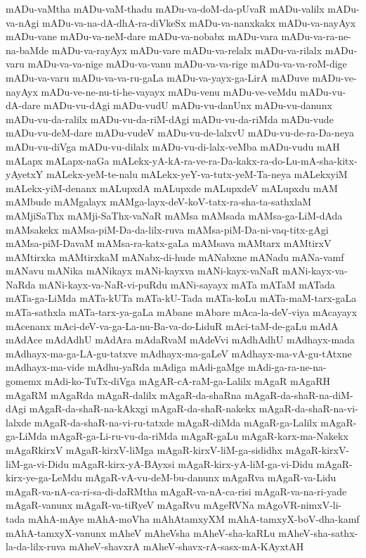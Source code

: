 {mADu-vaMtha
mADu-vaM-thadu
mADu-va-doM-da-pUvaR
mADu-valilx
mADu-va-nAgi
mADu-va-na-dA-dhA-ra-diVkeSx
mADu-va-nanxkakx
mADu-va-nayAyx
mADu-vane
mADu-va-neM-dare
mADu-va-nobabx
mADu-vara
mADu-va-ra-ne-na-baMde
mADu-va-rayAyx
mADu-vare
mADu-va-relalx
mADu-va-rilalx
mADu-varu
mADu-va-va-nige
mADu-va-vanu
mADu-va-va-rige
mADu-va-va-roM-dige
mADu-va-varu
mADu-va-va-ru-gaLa
mADu-va-yayx-ga-LirA
mADuve
mADu-ve-nayAyx
mADu-ve-ne-nu-ti-he-vayayx
mADu-venu
mADu-ve-veMdu
mADu-vu-dA-dare
mADu-vu-dAgi
mADu-vudU
mADu-vu-danUnx
mADu-vu-danunx
mADu-vu-da-ralilx
mADu-vu-da-riM-dAgi
mADu-vu-da-riMda
mADu-vude
mADu-vu-deM-dare
mADu-vudeV
mADu-vu-de-lalxvU
mADu-vu-de-ra-Da-neya
mADu-vu-diVga
mADu-vu-dilalx
mADu-vu-di-lalx-veMba
mADu-vudu
mAH
mALapx
mALapx-naGa
mALekx-yA-kA-ra-ve-ra-Da-kakx-ra-do-Lu-mA-sha-kitx-yAyetxY
mALekx-yeM-te-nalu
mALekx-yeY-va-tutx-yeM-Ta-neya
mALekxyiM
mALekx-yiM-denanx
mALupxdA
mALupxde
mALupxdeV
mALupxdu
mAM
mAMbude
mAMgalayx
mAMga-layx-deV-koV-tatx-ra-sha-ta-sathxlaM
mAMjiSaThx
mAMji-SaThx-vaNaR
mAMsa
mAMsada
mAMsa-ga-LiM-dAda
mAMsakekx
mAMsa-piM-Da-da-lilx-ruva
mAMsa-piM-Da-ni-vaq-titx-gAgi
mAMsa-piM-DavaM
mAMsa-ra-katx-gaLa
mAMsava
mAMtarx
mAMtirxV
mAMtirxka
mAMtirxkaM
mANabx-di-hude
mANabxne
mANadu
mANa-vamf
mANavu
mANika
mANikayx
mANi-kayxva
mANi-kayx-vaNaR
mANi-kayx-va-NaRda
mANi-kayx-va-NaR-vi-puRdu
mANi-sayayx
mATa
mATaM
mATada
mATa-ga-LiMda
mATa-kUTa
mATa-kU-Tada
mATa-koLu
mATa-maM-tarx-gaLa
mATa-sathxla
mATa-tarx-ya-gaLa
mAbane
mAbare
mAca-la-deV-viya
mAcayayx
mAcenanx
mAci-deV-va-ga-La-nu-Ba-va-do-LiduR
mAci-taM-de-gaLu
mAdA
mAdAce
mAdAdhU
mAdAra
mAdaRvaM
mAdeVvi
mAdhAdhU
mAdhayx-mada
mAdhayx-ma-ga-LA-gu-tatxve
mAdhayx-ma-gaLeV
mAdhayx-ma-vA-gu-tAtxne
mAdhayx-ma-vide
mAdhu-yaRda
mAdiga
mAdi-gaMge
mAdi-ga-ra-ne-na-gomemx
mAdi-ko-TuTx-diVga
mAgAR-cA-raM-ga-Lalilx
mAgaR
mAgaRH
mAgaRM
mAgaRda
mAgaR-dalilx
mAgaR-da-shaRna
mAgaR-da-shaR-na-diM-dAgi
mAgaR-da-shaR-na-kAkxgi
mAgaR-da-shaR-nakekx
mAgaR-da-shaR-na-vi-lalxde
mAgaR-da-shaR-na-vi-ru-tatxde
mAgaR-diMda
mAgaR-ga-Lalilx
mAgaR-ga-LiMda
mAgaR-ga-Li-ru-vu-da-riMda
mAgaR-gaLu
mAgaR-karx-ma-Nakekx
mAgaRkirxV
mAgaR-kirxV-liMga
mAgaR-kirxV-liM-ga-sididhx
mAgaR-kirxV-liM-ga-vi-Didu
mAgaR-kirx-yA-BAyxsi
mAgaR-kirx-yA-liM-ga-vi-Didu
mAgaR-kirx-ye-ga-LeMdu
mAgaR-vA-vu-deM-bu-danunx
mAgaRva
mAgaR-va-Lidu
mAgaR-va-nA-ca-ri-sa-di-daRMtha
mAgaR-va-nA-ca-risi
mAgaR-va-na-ri-yade
mAgaR-vanunx
mAgaR-va-tiRyeV
mAgaRvu
mAgeRVNa
mAgoVR-nimxV-li-tada
mAhA-mAye
mAhA-moVha
mAhAtamxyXM
mAhA-tamxyX-boV-dha-kamf
mAhA-tamxyX-vanunx
mAheV
mAheVsha
mAheV-sha-kaRLu
mAheV-sha-sathx-la-da-lilx-ruva
mAheV-shavxrA
mAheV-shavx-rA-sasx-mA-KAyxtAH
}
